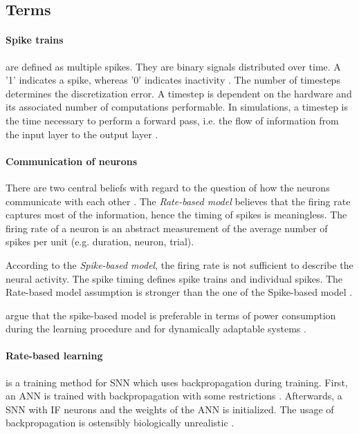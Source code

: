 \newcommand\rbModel{Rate-based model}
\newcommand\sbModel{Spike-based model}
\subsection{Terms}
\label{subsec:terms}

\paragraph{\textbf{Spike trains}}
are defined as multiple spikes.
They are binary signals distributed over time.
A '1' indicates a spike, whereas '0' indicates inactivity \cite{DIET_SNN}.
The number of timesteps determines the discretization error.
A timestep is dependent on the hardware and its associated number of computations performable.
In simulations, a timestep is the time necessary to perform a forward pass, i.e. the flow of information from the input layer to the output layer \cite{DIET_SNN}.

\vspace{-3mm}
\paragraph{\textbf{Communication of neurons}}
There are two central beliefs with regard to the question of how the neurons communicate with each other \cite{spike_vs_rate}.
The \textit{\rbModel{}} believes that the firing rate captures most of the information, hence the timing of spikes is meaningless.
The firing rate of a neuron is an abstract measurement of the average number of spikes per unit (e.g. duration, neuron, trial).

According to the \textit{\sbModel{}}, the firing rate is not sufficient to describe the neural activity.
The spike timing defines spike trains and individual spikes.
The \rbModel{} assumption is stronger than the one of the \sbModel{} \cite{spike_vs_rate}.

\authorsSNN{} argue that the spike-based model is preferable in terms of power consumption 
during the learning procedure and for dynamically adaptable systems \cite{SNN}.

\vspace{-3mm}
\paragraph{\textbf{Rate-based learning}} is a training method for \ac{SNN} which uses backpropagation during training. 
First, an \ac{ANN} is trained with backpropagation with some restrictions \cite{ANN_SNN_conversion,DIET_SNN}.
Afterwards, a \ac{SNN} with \ac{IF} neurons and the weights of the \ac{ANN} is initialized.
The usage of backpropagation is ostensibly biologically unrealistic \cite{STDP_like,SNN}.
